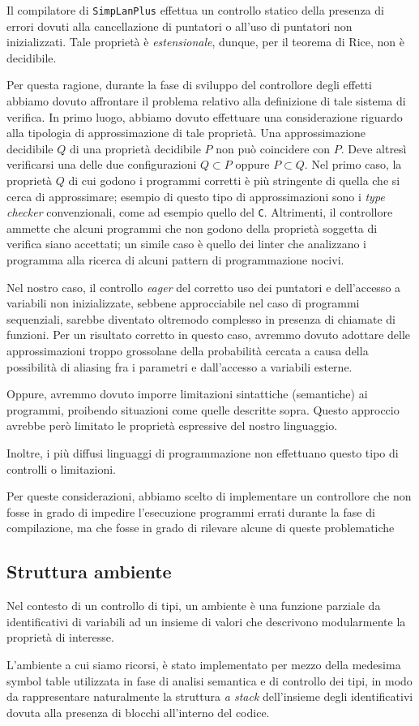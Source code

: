 \documentclass[../../main]{subfiles}
\begin{document}
Il compilatore di \texttt{SimpLanPlus} effettua un controllo statico della presenza di errori dovuti alla cancellazione di puntatori o all'uso di puntatori non inizializzati. Tale proprietà è \emph{estensionale}, dunque, per il teorema di Rice, non è decidibile. 

Per questa ragione, durante la fase di sviluppo del controllore degli effetti abbiamo dovuto affrontare il problema relativo alla definizione di tale sistema di verifica. In primo luogo, abbiamo dovuto effettuare una considerazione riguardo alla tipologia di approssimazione di tale proprietà. Una approssimazione decidibile $Q$ di una proprietà decidibile $P$ non può coincidere con $P$. Deve altresì verificarsi una delle due configurazioni $Q\subset P$ oppure $P \subset Q$. Nel primo caso, la proprietà $Q$ di cui godono i programmi corretti è più stringente di quella che si cerca di approssimare; esempio di questo tipo di approssimazioni sono i \emph{type checker} convenzionali, come ad esempio quello del \texttt{C}. Altrimenti, il controllore ammette che alcuni programmi che non godono della proprietà soggetta di verifica siano accettati; un simile caso è quello dei linter che analizzano i programma alla ricerca di alcuni pattern di programmazione nocivi.

Nel nostro caso, il controllo \emph{eager} del corretto uso dei puntatori e dell'accesso a variabili non inizializzate, sebbene approcciabile nel caso di programmi sequenziali, sarebbe diventato oltremodo complesso in presenza di chiamate di funzioni. Per un risultato corretto in questo caso, avremmo dovuto adottare delle approssimazioni troppo grossolane della probabilità cercata a causa della possibilità di aliasing fra i parametri e dall'accesso a variabili esterne.

Oppure, avremmo dovuto imporre limitazioni sintattiche (semantiche) ai programmi, proibendo situazioni come quelle descritte sopra. Questo approccio avrebbe però limitato le proprietà espressive del nostro linguaggio.

Inoltre, i più diffusi linguaggi di programmazione non effettuano questo tipo di controlli o limitazioni.

Per queste considerazioni, abbiamo scelto di implementare un controllore che non fosse in grado di impedire l'esecuzione programmi errati durante la fase di compilazione, ma che fosse in grado di rilevare alcune di queste problematiche 

\subsection{Struttura ambiente}

Nel contesto di un controllo di tipi, un ambiente è una funzione parziale da identificativi di variabili ad un insieme di valori che descrivono modularmente la proprietà di interesse.

L'ambiente a cui siamo ricorsi, è stato implementato per mezzo della medesima symbol table utilizzata in fase di analisi semantica e di controllo dei tipi, in modo da rappresentare naturalmente la struttura \emph{a stack} dell'insieme degli identificativi dovuta alla presenza di blocchi all'interno del codice. 
\end{document}
